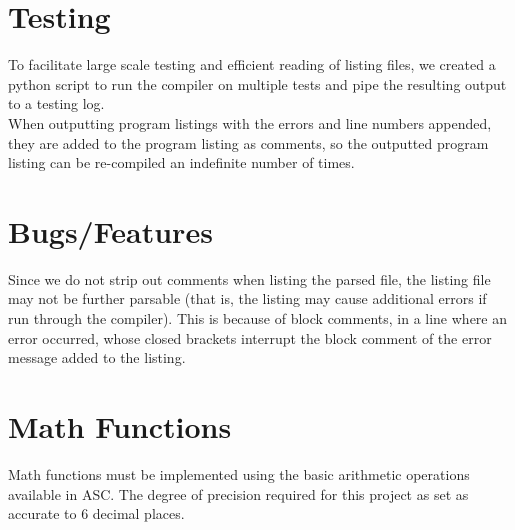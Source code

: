 \documentclass{report}
\begin{document}
\section*{Testing}
To facilitate large scale testing and efficient reading of listing files, we created a python script to run the compiler on multiple tests and pipe the resulting output to a testing log.\\
When outputting program listings with the errors and line numbers appended, they are added to the program listing as comments, so the outputted program listing can be re-compiled an indefinite number of times.


\section*{Bugs/Features}
Since we do not strip out comments when listing the parsed file, the listing file may not be further parsable (that is, the listing may cause additional errors if run through the compiler). This is because of block comments, in a line where an error occurred, whose closed brackets interrupt the block comment of the error message added to the listing.

\section*{Math Functions}
Math functions must be implemented using the basic arithmetic operations available in ASC. The degree of precision required for this project as set as accurate to 6 decimal places. 
\end{document}
